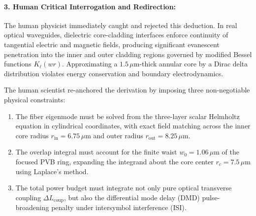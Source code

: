 \documentclass{optica-article}
\begin{document}
\paragraph{3. Human Critical Interrogation and Redirection:}
The human physicist immediately caught and rejected this deduction. In real optical waveguides, dielectric core-cladding interfaces enforce continuity of tangential electric and magnetic fields, producing significant evanescent penetration into the inner and outer cladding regions governed by modified Bessel functions $K_\ell(w r)$. Approximating a $1.5\,\mu\text{m}$-thick annular core by a Dirac delta distribution violates energy conservation and boundary electrodynamics.

The human scientist re-anchored the derivation by imposing three non-negotiable physical constraints:
\begin{enumerate}
    \item The fiber eigenmode must be solved from the three-layer scalar Helmholtz equation in cylindrical coordinates, with exact field matching across the inner core radius $r_{\text{in}} = 6.75\,\mu\text{m}$ and outer radius $r_{\text{out}} = 8.25\,\mu\text{m}$.
    \item The overlap integral must account for the finite waist $w_0 = 1.06\,\mu\text{m}$ of the focused PVB ring, expanding the integrand about the core center $r_c = 7.5\,\mu\text{m}$ using Laplace's method.
    \item The total power budget must integrate not only pure optical transverse coupling $\Delta L_{\text{coup}}$, but also the differential mode delay (DMD) pulse-broadening penalty under intersymbol interference (ISI).
\end{enumerate}
\end{document}
